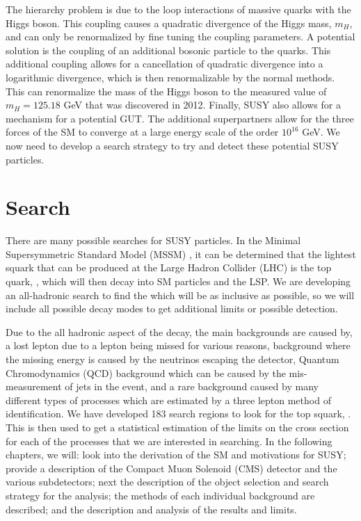 The hierarchy problem is due to the loop interactions of massive quarks with the Higgs boson. This coupling causes a quadratic divergence of the Higgs mass, $m_H$, and can only be renormalized by fine tuning the coupling parameters. A potential solution is the coupling of an additional bosonic particle to the quarks. This additional coupling allows for a cancellation of quadratic divergence into a logarithmic divergence, which is then renormalizable by the normal methods. This can renormalize the mass of the Higgs boson to the measured value of $m_H=125.18$ GeV \cite{chatrchyan_observation_2012, aad_observation_2012, chatrchyan_observation_2013, atlas_collaboration_combined_2015} that was discovered in 2012. Finally, SUSY also allows for a mechanism for a potential GUT. The additional superpartners allow for the three forces of the SM to converge at a large energy scale of the order $10^{16}$ GeV. We now need to develop a search strategy to try and detect these potential SUSY particles.

\section{Search}
\label{sec:search}

There are many possible searches for SUSY particles. In the Minimal Supersymmetric Standard Model (MSSM) \cite{martin_supersymmetry_1997}, it can be determined that the lightest squark that can be produced at the Large Hadron Collider (LHC) is the top quark, \st{}, which will then decay into SM particles and the LSP.  We are developing an all-hadronic search to find the \st{} which will be as inclusive as possible, so we will include all possible decay modes to get additional limits or possible detection. 

Due to the all hadronic aspect of the decay, the main backgrounds are caused by, a lost lepton due to a lepton being missed for various reasons, \Znunu{} background where the missing energy is caused by the neutrinos escaping the detector, Quantum Chromodynamics (QCD) background which can be caused by the mis-measurement of jets in the event, and a rare background caused by many different types of processes which are estimated by a three lepton method of identification. We have developed 183 search regions to look for the top squark, \st{}. This is then used to get a statistical estimation of the limits on the cross section for each of the processes that we are interested in searching. In the following chapters, we will: look into the derivation of the SM and motivations for SUSY; provide a description of the Compact Muon Solenoid (CMS) detector and the various subdetectors; next the description of the object selection and search strategy for the analysis; the methods of each individual background are described; and the description and analysis of the results and limits. 

